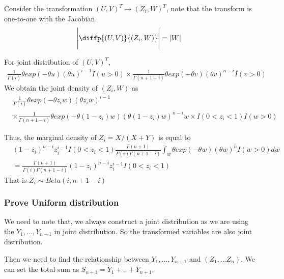\documentclass[11pt]{article} %
\begin{document}
Consider the transformation $(U,V)^T \rightarrow (Z_i, W)^T$, note that the transform is one-to-one with the Jacobian
\begin{align*}
	\Bigg |\diffp{(U,V)}{{(Z_i, W)}} \Bigg | &= |W|
\end{align*}
 
For joint distribution of  $(U,V)^T$, 
\begin{align*}
	\frac{1}{\Gamma{(i)}} \theta exp(-\theta u) (\theta u)^{i-1} I(u > 0) \times \frac{1}{\Gamma{(n+1-i)}} \theta exp(-\theta v) (\theta v)^{n-i} I(v > 0)
\end{align*}
We obtain the joint density of $(Z_i, W)$ as 
\begin{align*}
&	\frac{1}{\Gamma{(i)}} \theta exp(-\theta z_i w) (\theta z_i w)^{i-1} \\
	& \times \frac{1}{\Gamma{(n+1-i)}} \theta exp(-\theta (1-z_i) w) (\theta (1-z_i) w)^{n-i} w \times I(0< z_i< 1) I(w > 0)
\end{align*}

Thus, the marginal density of $Z_i = X/(X+Y)$ is equal to
\begin{align*}
 & (1-z_i)^{n-i} z_i^{i-1} I(0< z_i <1)	\frac{\Gamma(n+1)}{\Gamma(i) \Gamma(n+1-i)} \int_{w} \theta exp(-\theta w) (\theta w)^n I(w>0) 	dw \\
 &= \frac{\Gamma(n+1)}{\Gamma(i) \Gamma(n+1-i)} (1-z_i)^{n-i} z_i^{i-1} I(0< z_i <1)
\end{align*}
That is $Z_i \sim Beta(i, n+1-i)$

\subsubsection{Prove Uniform distribution}



We need to note that, we always construct a joint distribution as we are using the $Y_1, ..., Y_{n+1}$ in joint distribution. So the transformed variables are also joint distribution.

Then we need to find the relationship between $Y_1, ..., Y_{n+1}$ and $(Z_1, ... Z_n)$. We can set the total sum as $S_{n+1} = Y_1+ .. + Y_{n+1}$.
\end{document}
